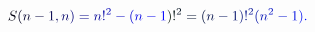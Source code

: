 \documentclass[12pt]{article}
\begin{document}
\makeatletter
\renewcommand*{\@textcolor}[3]{%
  \protect\leavevmode
  \begingroup
    \color#1{#2}#3%
  \endgroup
}
\makeatother
\begin{displaymath}
\mathcolor[RGB]{0,0,15}{S} \mathcolor[RGB]{0,0,30}{(} \mathcolor[RGB]{0,0,45}{n} \mathcolor[RGB]{0,0,60}{-} \mathcolor[RGB]{0,0,75}{1} \mathcolor[RGB]{0,0,90}{,} \mathcolor[RGB]{0,0,105}{n} \mathcolor[RGB]{0,0,120}{)} \mathcolor[RGB]{0,0,135}{=} \mathcolor[RGB]{0,0,150}{n} \mathcolor[RGB]{0,0,165}{!} ^ { \mathcolor[RGB]{0,0,180}{2} } \mathcolor[RGB]{0,0,195}{-} \mathcolor[RGB]{0,0,210}{(} \mathcolor[RGB]{0,0,225}{n} \mathcolor[RGB]{0,0,240}{-} \mathcolor[RGB]{0,0,255}{1} \mathcolor[RGB]{0,15,0}{)} \mathcolor[RGB]{0,15,15}{!} ^ { \mathcolor[RGB]{0,15,30}{2} } \mathcolor[RGB]{0,15,45}{=} \mathcolor[RGB]{0,15,60}{(} \mathcolor[RGB]{0,15,75}{n} \mathcolor[RGB]{0,15,90}{-} \mathcolor[RGB]{0,15,105}{1} \mathcolor[RGB]{0,15,120}{)} \mathcolor[RGB]{0,15,135}{!} ^ { \mathcolor[RGB]{0,15,150}{2} } \mathcolor[RGB]{0,15,165}{(} \mathcolor[RGB]{0,15,180}{n} ^ { \mathcolor[RGB]{0,15,195}{2} } \mathcolor[RGB]{0,15,210}{-} \mathcolor[RGB]{0,15,225}{1} \mathcolor[RGB]{0,15,240}{)} \mathcolor[RGB]{0,15,255}{.}
\end{displaymath}
\end{document}
